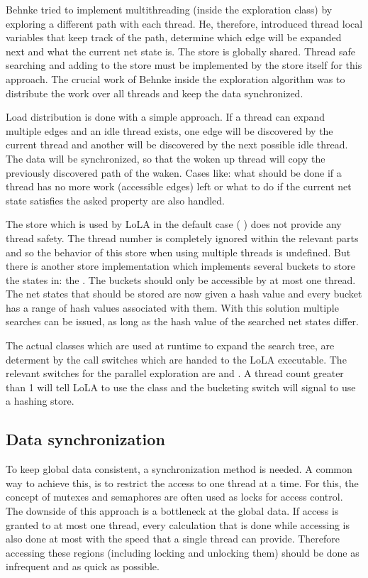 Behnke tried to implement multithreading (inside the exploration class) by exploring a different path with each thread. He, therefore, introduced thread local variables that keep track of the path, determine which edge will be expanded next and what the current net state is. The store is globally shared. Thread safe searching and adding to the store must be implemented by the store itself for this approach. The crucial work of Behnke inside the exploration algorithm was to distribute the work over all threads and keep the data synchronized.

Load distribution is done with a simple approach. If a thread can expand multiple edges and an idle thread exists, one edge will be discovered by the current thread and another will be discovered by the next possible idle thread. The data will be synchronized, so that the woken up thread will copy the previously discovered path of the waken. Cases like: what should be done if a thread has no more work (accessible edges) left or what to do if the current net state satisfies the asked property are also handled.

The store which is used by LoLA in the default case ( ) does not provide any thread safety. The thread number is completely ignored within the relevant parts and so the behavior of this store when using multiple threads is undefined. But there is another store implementation which implements several buckets to store the states in: the . The buckets should only be accessible by at most one thread. The net states that should be stored are now given a hash value and every bucket has a range of hash values associated with them. With this solution multiple searches can be issued, as long as the hash value of the searched net states differ.

The actual classes which are used at runtime to expand the search tree, are determent by the call switches which are handed to the LoLA executable. The relevant switches for the parallel exploration are  and . A thread count greater than 1 will tell LoLA to use the  class and the bucketing switch will signal to use a hashing store.

\subsection{Data synchronization}
To keep global data consistent, a synchronization method is needed. A common way to achieve this, is to restrict the access to one thread at a time. For this, the concept of mutexes and semaphores are often used as locks for access control. The downside of this approach is a bottleneck at the global data. If access is granted to at most one thread, every calculation that is done while accessing is also done at most with the speed that a single thread can provide. Therefore accessing these regions (including locking and unlocking them) should be done as infrequent and as quick as possible.

